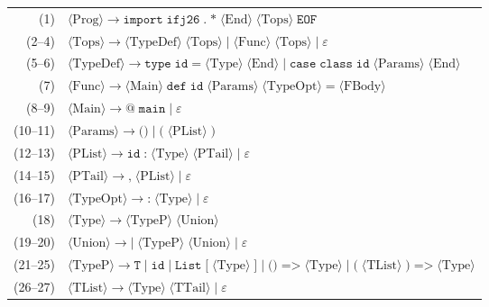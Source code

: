 \documentclass[11pt, a4paper]{article}
\renewcommand{\arraystretch}{1.15}%
\begin{document}
\vspace{-4pt}
\begingroup
\linespread{0.96}\selectfont
\footnotesize
\renewcommand{\arraystretch}{0.95}
\begin{tabular}{@{}r l@{}}
  (1)     & $\langle\text{Prog}\rangle \to \texttt{import}\;\texttt{ifj26}\;\texttt{.}\;\texttt{*}\;\langle\text{End}\rangle\;\langle\text{Tops}\rangle\;\texttt{EOF}$ \\
  (2--4)  & $\langle\text{Tops}\rangle \to \langle\text{TypeDef}\rangle\;\langle\text{Tops}\rangle \mid \langle\text{Func}\rangle\;\langle\text{Tops}\rangle \mid \varepsilon$ \\
  (5--6)  & $\langle\text{TypeDef}\rangle \to \texttt{type}\;\texttt{id}\;\texttt{=}\;\langle\text{Type}\rangle\;\langle\text{End}\rangle \mid \texttt{case}\;\texttt{class}\;\texttt{id}\;\langle\text{Params}\rangle\;\langle\text{End}\rangle$ \\
  (7)     & $\langle\text{Func}\rangle \to \langle\text{Main}\rangle\;\texttt{def}\;\texttt{id}\;\langle\text{Params}\rangle\;\langle\text{TypeOpt}\rangle\;\texttt{=}\;\langle\text{FBody}\rangle$ \\
  (8--9)  & $\langle\text{Main}\rangle \to \texttt{@}\;\texttt{main} \mid \varepsilon$ \\
  (10--11)& $\langle\text{Params}\rangle \to \texttt{()} \mid \texttt{(}\;\langle\text{PList}\rangle\;\texttt{)}$ \\
  (12--13)& $\langle\text{PList}\rangle \to \texttt{id}\;\texttt{:}\;\langle\text{Type}\rangle\;\langle\text{PTail}\rangle \mid \varepsilon$ \\
  (14--15)& $\langle\text{PTail}\rangle \to \texttt{,}\;\langle\text{PList}\rangle \mid \varepsilon$ \\
  (16--17)& $\langle\text{TypeOpt}\rangle \to \texttt{:}\;\langle\text{Type}\rangle \mid \varepsilon$ \\
  (18)    & $\langle\text{Type}\rangle \to \langle\text{TypeP}\rangle\;\langle\text{Union}\rangle$ \\
  (19--20)& $\langle\text{Union}\rangle \to \texttt{|}\;\langle\text{TypeP}\rangle\;\langle\text{Union}\rangle \mid \varepsilon$ \\
  (21--25)& $\langle\text{TypeP}\rangle \to \texttt{T} \mid \texttt{id} \mid \texttt{List}\;\texttt{[}\;\langle\text{Type}\rangle\;\texttt{]} \mid \texttt{()}\;\texttt{=>}\;\langle\text{Type}\rangle \mid \texttt{(}\;\langle\text{TList}\rangle\;\texttt{)}\;\texttt{=>}\;\langle\text{Type}\rangle$ \\
  (26--27)& $\langle\text{TList}\rangle \to \langle\text{Type}\rangle\;\langle\text{TTail}\rangle \mid \varepsilon$ \\

\end{tabular}
\end{document}
